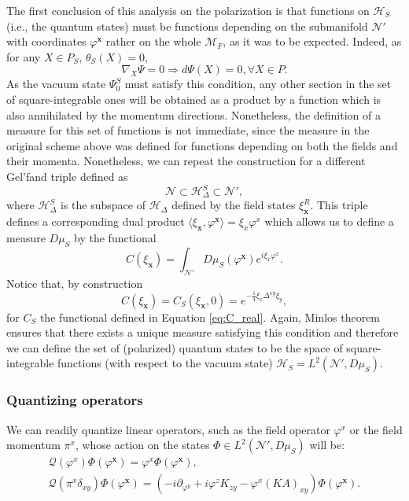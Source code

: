 \documentclass[12pt]{article}%
\begin{document}
The first conclusion of this analysis on the polarization is that functions on $\mathcal{H}_{S}$ (i.e., the quantum states) must be functions depending on the submanifold $\mathcal{N}'$ with coordinates $\varphi^{\mathbf{x}}$ rather on the whole $\mathcal{M}_F$, as it was to be expected.  Indeed, as for any $X\in P_S$,  $\theta_S(X)=0$, 
\begin{equation}
\label{eq:condition_polari}
\nabla_X \Psi=0 \Rightarrow d\Psi(X)=0, \forall X\in P.
\end{equation}
As the vacuum state $\Psi_0^S$ must satisfy this condition, any other section in the set of square-integrable ones will be obtained as a product by a function which is also annihilated by the momentum directions. Nonetheless, the definition of a measure for this set of functions is not immediate, since the measure in the original scheme above was defined for functions depending on both the fields and their momenta. Nonetheless, we can repeat the construction for a different Gel'fand triple defined as
\begin{equation}
\label{eq:gelfand_sch}
\mathcal{N}\subset \mathcal{H}_\Delta^S \subset \mathcal{N}',
\end{equation}
where $\mathcal{H}_\Delta^S$ is the subspace of $\mathcal{H}_\Delta$ defined by the field states $ \xi^R_\mathbf{x}$. This triple defines a corresponding dual product $\langle \xi_\mathbf{x}, \varphi^\mathbf{x} \rangle= \xi_x\varphi^x$ which allows us to define a measure $D\mu_S$ by the functional
\begin{equation}
\label{eq:measure_sch}
C(\xi_{\mathbf{x}})=\int_{\mathcal{N}'} D\mu_S( \varphi^\mathbf{x}) e^{i \xi_x\varphi^x }.
\end{equation}
Notice that, by construction
\begin{equation}
\label{eq:measure_sch_C}
C(\xi_\mathbf{x})=C_S(\xi_\mathbf{x}, 0)= e^{-\frac14\xi_x\Delta^{xy}\xi_y}, 
\end{equation}
for $C_S$ the functional defined in Equation \eqref{eq:C_real}. Again, Minlos theorem ensures that there exists a unique measure satisfying this condition and therefore we can define the set of (polarized) quantum states to be the space of square-integrable functions (with respect to the vacuum state) $\mathcal{H}_S=L^2(\mathcal{N}', D\mu_S)$. 


\subsubsection{Quantizing operators}
We can readily quantize linear operators, such as the field operator $\varphi^x$ or the field momentum  $\pi^x$, whose action on the states $\Phi\in L^2(\mathcal{N}', D\mu_S)$ will be:
\begin{multline}
\label{eq:quantizationOfSchOperators}
\mathcal{Q}(\varphi^x) \Phi (\varphi^\mathbf{x})= \varphi^x \Phi(\varphi^\mathbf{x}),\\
 \mathcal{Q}(\pi^x\delta_{xy})\Phi (\varphi^\mathbf{x})=\left (-i\partial_{\varphi^y}+i{\varphi^zK_{zy}}-{\varphi^x(K A)_{xy}}\right ) \Phi(\varphi^\mathbf{x}).
\end{multline}
\end{document}
